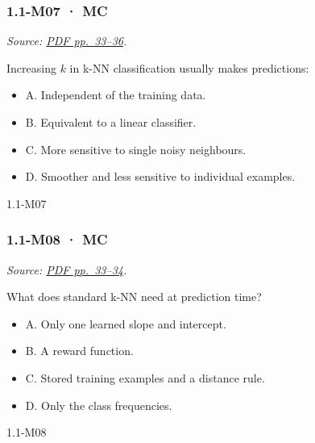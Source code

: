 \noindent\begin{minipage}{\linewidth}

\subsubsection{1.1-M07 · MC}\label{m07-mc}

\emph{Source:
\href{../Lecture\%20Slides/1.1.\%20Fundamentals.pdf\#page=33}{PDF
pp.~33--36}.}

Increasing \(k\) in k-NN classification usually makes predictions:

\begin{itemize}
\tightlist
\item
  A. Independent of the training data.
\item
  B. Equivalent to a linear classifier.
\item
  C. More sensitive to single noisy neighbours.
\item
  D. Smoother and less sensitive to individual examples.
\end{itemize}

\begin{solution}[8mm]{1.1-M07}

\end{solution}
\end{minipage}\par\medskip

\noindent\begin{minipage}{\linewidth}

\subsubsection{1.1-M08 · MC}\label{m08-mc}

\emph{Source:
\href{../Lecture\%20Slides/1.1.\%20Fundamentals.pdf\#page=33}{PDF
pp.~33--34}.}

What does standard k-NN need at prediction time?

\begin{itemize}
\tightlist
\item
  A. Only one learned slope and intercept.
\item
  B. A reward function.
\item
  C. Stored training examples and a distance rule.
\item
  D. Only the class frequencies.
\end{itemize}

\begin{solution}[8mm]{1.1-M08}

\end{solution}
\end{minipage}\par\medskip

